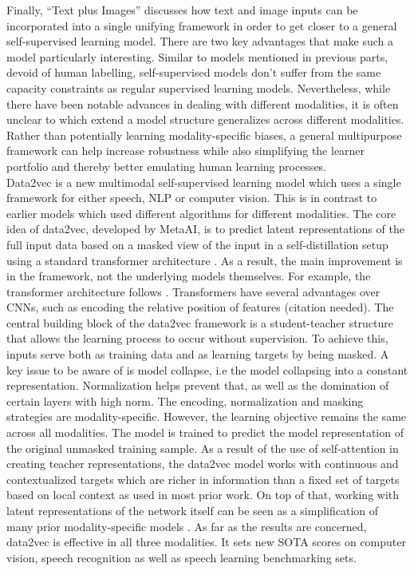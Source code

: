 \documentclass[
]{krantz}
\begin{document}
Finally, ``Text plus Images'' discusses how text and image inputs can be incorporated into a single unifying framework in order to get closer to a general self-supervised learning model.
There are two key advantages that make such a model particularly interesting.
Similar to models mentioned in previous parts, devoid of human labelling, self-supervised models don't suffer from the same capacity constraints as regular supervised learning models.
Nevertheless, while there have been notable advances in dealing with different modalities, it is often unclear to which extend a model structure generalizes across different modalities.
Rather than potentially learning modality-specific biases, a general multipurpose framework can help increase robustness while also simplifying the learner portfolio and thereby better emulating human learning processes.\\
Data2vec \citep{baevski2022data2vec} is a new multimodal self-supervised learning model which uses a single framework for either speech, NLP or computer vision.
This is in contrast to earlier models which used different algorithms for different modalities.
The core idea of data2vec, developed by MetaAI, is to predict latent representations of the full input data based on a masked view of the input in a self-distillation setup using a standard transformer architecture \citep{baevski2022data2vec}.
As a result, the main improvement is in the framework, not the underlying models themselves.
For example, the transformer architecture follows \citet{vaswani2017attention}.
Transformers have several advantages over CNNs, such as encoding the relative position of features (citation needed).
The central building block of the data2vec framework is a student-teacher structure that allows the learning process to occur without supervision.
To achieve this, inputs serve both as training data and as learning targets by being masked.
A key issue to be aware of is model collapse, i.e the model collapsing into a constant representation.
Normalization helps prevent that, as well as the domination of certain layers with high norm.
The encoding, normalization and masking strategies are modality-specific.
However, the learning objective remains the same across all modalities.
The model is trained to predict the model representation of the original unmasked training sample.
As a result of the use of self-attention in creating teacher representations, the data2vec model works with continuous and contextualized targets which are richer in information than a fixed set of targets based on local context as used in most prior work.
On top of that, working with latent representations of the network itself can be seen as a simplification of many prior modality-specific models \citep{baevski2022data2vec}.
As far as the results are concerned, data2vec is effective in all three modalities.
It sets new SOTA scores on computer vision, speech recognition as well as speech learning benchmarking sets.
\end{document}
